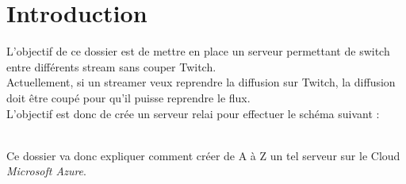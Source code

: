 \chapter*{Introduction}



L'objectif de ce dossier est de mettre en place un serveur permettant de switch entre différents stream sans couper Twitch.\\

Actuellement, si un streamer veux reprendre la diffusion sur Twitch, la diffusion doit être coupé pour qu'il puisse reprendre le flux.\\

L'objectif est donc de crée un serveur relai pour effectuer le schéma suivant :




\\

Ce dossier va donc expliquer comment créer de A à Z un tel serveur sur le Cloud \textit{Microsoft Azure}.


